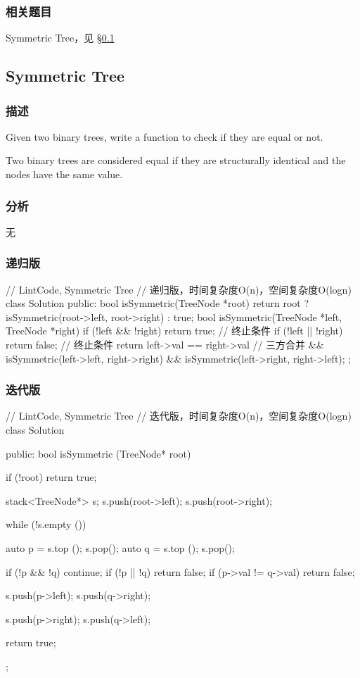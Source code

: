 \subsubsection{相关题目}
\begindot
\item Symmetric Tree，见 \S \ref{sec:symmetric-tree}
\myenddot


\subsection{Symmetric Tree}
\label{sec:symmetric-tree}


\subsubsection{描述}
Given two binary trees, write a function to check if they are equal or not.

Two binary trees are considered equal if they are structurally identical and the nodes have the same value.


\subsubsection{分析}
无


\subsubsection{递归版}
\begin{Code}
// LintCode, Symmetric Tree
// 递归版，时间复杂度O(n)，空间复杂度O(logn)
class Solution {
public:
    bool isSymmetric(TreeNode *root) {
        return root ? isSymmetric(root->left, root->right) : true;
    }
    bool isSymmetric(TreeNode *left, TreeNode *right) {
        if (!left && !right) return true;   // 终止条件
        if (!left || !right) return false;  // 终止条件
        return left->val == right->val      // 三方合并
                && isSymmetric(left->left, right->right)
                && isSymmetric(left->right, right->left);
    }
};
\end{Code}


\subsubsection{迭代版}
\begin{Code}
// LintCode, Symmetric Tree
// 迭代版，时间复杂度O(n)，空间复杂度O(logn)
class Solution {
public:
    bool isSymmetric (TreeNode* root) {
        if (!root) return true;

        stack<TreeNode*> s;
        s.push(root->left);
        s.push(root->right);

        while (!s.empty ()) {
            auto p = s.top (); s.pop();
            auto q = s.top (); s.pop();

            if (!p && !q) continue;
            if (!p || !q) return false;
            if (p->val != q->val) return false;

            s.push(p->left);
            s.push(q->right);

            s.push(p->right);
            s.push(q->left);
        }

        return true;
    }
};
\end{Code}


